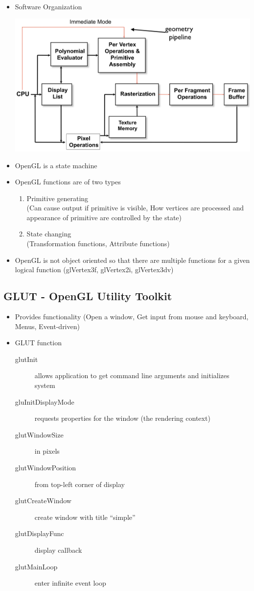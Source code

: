 \documentclass[11pt,a4paper]{article}
\begin{document}
\begin{itemize}
			\item Software Organization
			\begin{center}
				\includegraphics[scale=0.3]{pictures/pic3.jpg}
			\end{center}
			\item OpenGL is a state machine
			\item OpenGL functions are of two types
				\begin{enumerate}
					\item Primitive generating \\
						(Can cause output if primitive is visible, How vertices are processed and appearance of primitive are controlled by the state)
					\item State changing\\
						(Transformation functions, Attribute functions)
				\end{enumerate}
			\item OpenGL is not object oriented so that there are multiple functions for a given logical function (glVertex3f, glVertex2i, glVertex3dv)
		\end{itemize}
	\subsection{GLUT - OpenGL Utility Toolkit}
		\begin{itemize}
			\item  Provides functionality (Open a window, Get input from mouse and keyboard, Menus, Event-driven)
			\item GLUT function
				\begin{description}
					\item[glutInit] allows application to get command line arguments and initializes system
					\item[gluInitDisplayMode] requests properties for the window (the rendering context) 	
					\item[glutWindowSize] in pixels
					\item[glutWindowPosition] from top-left corner of display 	
					\item[glutCreateWindow] create window with title “simple” 	
					\item[glutDisplayFunc] display callback
					\item[glutMainLoop] enter infinite event loop						
				\end{description}
		\end{itemize}
\end{document}
